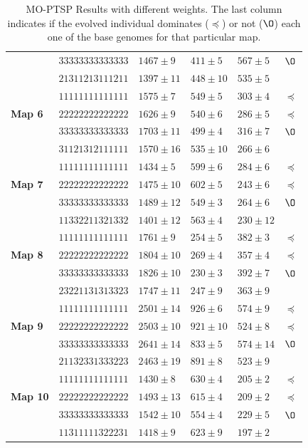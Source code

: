 \documentclass[journal]{IEEEtran}
\begin{document}
\begin{table}[!t]
\begin{center}
\begin{tabular}{|p{0.8cm}|p{1.95cm}|m{1.13cm}|m{1.13cm}|m{1.13cm}|m{0.1cm}|}
 & $33333333333333$ & $1467 \pm 9$ & $411 \pm 5$ & $567 \pm 5$ & $\O$ \\
 & $21311213111211$ & $1397 \pm 11$ & $448 \pm 10$ & $535 \pm 5$ & \\
\hline
 \multirow{3}{*}{\textbf{Map 6}} & $11111111111111$ & $1575 \pm 7$ & $549 \pm 5$& $303 \pm 4$ & $\preceq$ \\
 & $22222222222222$ & $1626 \pm 9$ & $540 \pm 6$ & $286 \pm 5$ & $\preceq$ \\
 & $33333333333333$ & $1703 \pm 11$ & $499 \pm 4$ & $316 \pm 7$ & $\O$ \\
 & $31121312111111$ & $1570 \pm 16$ & $535 \pm 10$ & $266 \pm 6$ & \\
\hline
 \multirow{3}{*}{\textbf{Map 7}} & $11111111111111$ & $1434 \pm 5$ & $599 \pm 6$& $284 \pm 6$ & $\preceq$ \\
 & $22222222222222$ & $1475 \pm 10$ & $602 \pm 5$ & $243 \pm 6$ & $\preceq$ \\
 & $33333333333333$ & $1489 \pm 12$ & $549 \pm 3$ & $264 \pm 6$ & $\O$ \\
 & $11332211321332$ & $1401 \pm 12$ & $563 \pm 4$ & $230 \pm 12$ & \\
\hline
 \multirow{3}{*}{\textbf{Map 8}} & $11111111111111$ & $1761 \pm 9$ & $254 \pm 5$& $382 \pm 3$ & $\preceq$ \\
 & $22222222222222$ & $1804 \pm 10$ & $269 \pm 4$ & $357 \pm 4$ & $\preceq$ \\
 & $33333333333333$ & $1826 \pm 10$ & $230 \pm 3$ & $392 \pm 7$ & $\O$ \\
 & $23221131313323$ & $1747 \pm 11$ & $247 \pm 9$ & $363 \pm 9$ & \\
\hline
 \multirow{3}{*}{\textbf{Map 9}} & $11111111111111$ & $2501 \pm 14$ & $926 \pm 6$& $574 \pm 9$ & $\preceq$ \\
 & $22222222222222$ & $2503 \pm 10$ & $921 \pm 10$ & $524 \pm 8$ & $\preceq$ \\
 & $33333333333333$ & $2641 \pm 14$ & $833 \pm 5$ & $574 \pm 14$ & $\O$ \\
 & $21132331333223$ & $2463 \pm 19$ & $891 \pm 8$ & $523 \pm 9$ & \\
\hline
 \multirow{3}{*}{\textbf{Map 10}} & $11111111111111$ & $1430 \pm 8$ & $630 \pm 4$& $205 \pm 2$ & $\preceq$ \\
 & $22222222222222$ & $1493 \pm 13$ & $615 \pm 4$ & $209 \pm 2$ & $\preceq$ \\
 & $33333333333333$ & $1542 \pm 10$ & $554 \pm 4$ & $229 \pm 5$ & $\O$ \\
 & $11311111322231$ & $1418 \pm 9$ & $623 \pm 9$ & $197 \pm 2$ & \\
\hline
\end{tabular}
\caption{MO-PTSP Results with different weights. The last column indicates if the evolved individual dominates ($\preceq$) or not ($\O$) each one of the base genomes for that particular map.}
\label{tab:resVarW}
\end{center}
\end{table}
\end{document}
